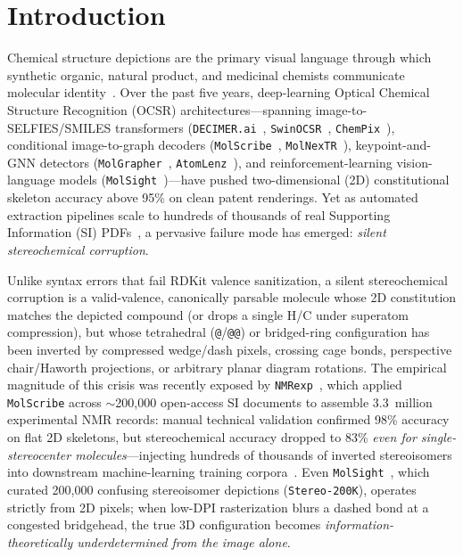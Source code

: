 \documentclass[10pt,twocolumn]{article}
\begin{document}
\begin{abstract}
experimental $^{13}\text{C}/^{1}\text{H}$ data and simulated HRMS (15 literature isomer pairs; $^{13}\text{C}$ MAE $= 5.25$~ppm, $r = 0.9810$) recovers 73.3\% [56.7, 86.7] (\texttt{MMFF94s}) and 66.7\% [50.0, 83.3] (\texttt{MACE-OFF23-medium//MMFF94s}) of true stereoisomers from a fixed mock beam that ranks the true isomer last.
\end{abstract}

\section{Introduction}
\label{sec:intro}

Chemical structure depictions are the primary visual language through which synthetic organic, natural product, and medicinal chemists communicate molecular identity~\cite{Rajan2023DECIMER,Qian2023MolScribe,Fan2024OpenChemIE}. Over the past five years, deep-learning Optical Chemical Structure Recognition (OCSR) architectures---spanning image-to-SELFIES/SMILES transformers (\texttt{DECIMER.ai}~\cite{Rajan2023DECIMER}, \texttt{SwinOCSR}~\cite{Xu2022SwinOCSR}, \texttt{ChemPix}~\cite{Weir2021ChemPix}), conditional image-to-graph decoders (\texttt{MolScribe}~\cite{Qian2023MolScribe}, \texttt{MolNexTR}~\cite{Chen2024MolNexTR}), keypoint-and-GNN detectors (\texttt{MolGrapher}~\cite{Morin2023MolGrapher}, \texttt{AtomLenz}~\cite{Oldenhof2024AtomLenz}), and reinforcement-learning vision-language models (\texttt{MolSight}~\cite{Zhang2026MolSight})---have pushed two-dimensional (2D) constitutional skeleton accuracy above 95\% on clean patent renderings. Yet as automated extraction pipelines scale to hundreds of thousands of real Supporting Information (SI) PDFs~\cite{Mavracic2021ChemDataExtractor2,Kearnes2021ORD,Wang2025NMRexp,Wang2025NMRExtractor}, a pervasive failure mode has emerged: \emph{silent stereochemical corruption}.

Unlike syntax errors that fail RDKit valence sanitization, a silent stereochemical corruption is a valid-valence, canonically parsable molecule whose 2D constitution matches the depicted compound (or drops a single H/C under superatom compression), but whose tetrahedral (\texttt{@}/\texttt{@@}) or bridged-ring configuration has been inverted by compressed wedge/dash pixels, crossing cage bonds, perspective chair/Haworth projections, or arbitrary planar diagram rotations. The empirical magnitude of this crisis was recently exposed by \texttt{NMRexp}~\cite{Wang2025NMRexp}, which applied \texttt{MolScribe} across $\sim$200,000 open-access SI documents to assemble 3.3~million experimental NMR records: manual technical validation confirmed 98\% accuracy on flat 2D skeletons, but stereochemical accuracy dropped to 83\% \emph{even for single-stereocenter molecules}---injecting hundreds of thousands of inverted stereoisomers into downstream machine-learning training corpora~\cite{Fourches2010TrustButVerify,Wang2025NMRExtractor}. Even \texttt{MolSight}~\cite{Zhang2026MolSight}, which curated 200,000 confusing stereoisomer depictions (\texttt{Stereo-200K}), operates strictly from 2D pixels; when low-DPI rasterization blurs a dashed bond at a congested bridgehead, the true 3D configuration becomes \emph{information-theoretically underdetermined from the image alone}.
\end{document}
